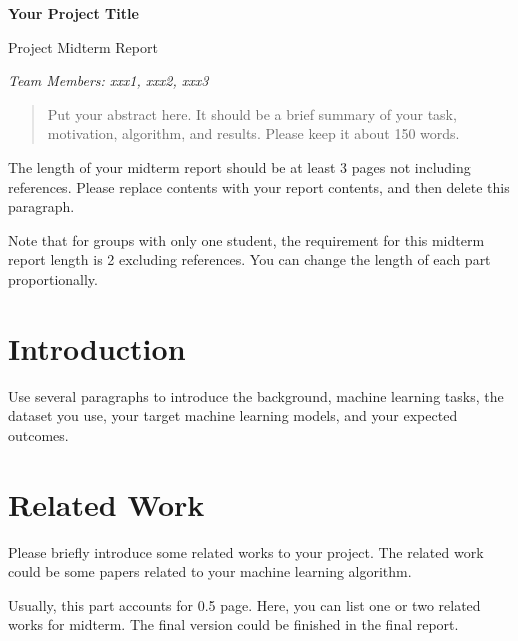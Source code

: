 \documentclass[11pt]{article}
\begin{document}
\begin{center}
{\Large \textbf{Your Project Title}

\vspace{10pt}

Project Midterm Report}

\vspace{10pt}

\textit{Team Members: xxx1, xxx2, xxx3}
\end{center}




\begin{abstract}
  Put your abstract here. It should be a brief summary of your
  task, motivation, algorithm, and results. Please keep it about
  150 words.
\end{abstract}

{\color{red} The length of your midterm report should be at least
3 pages not including references. Please replace contents with
your report contents, and then delete this paragraph.

Note that for groups with only one student, the requirement for
this midterm report length is 2 excluding references. You can
change the length of each part proportionally.}

\section{Introduction}

Use several paragraphs to introduce the background, machine
learning tasks, the dataset you use, your target machine learning
models, and your expected outcomes.

\section{Related Work}

Please briefly introduce some related works to your project. The
related work could be some papers related to your machine
learning algorithm.

Usually, this part accounts for 0.5 page. Here, you can list one
or two related works for midterm. The final version could be
finished in the final report.
\end{document}
